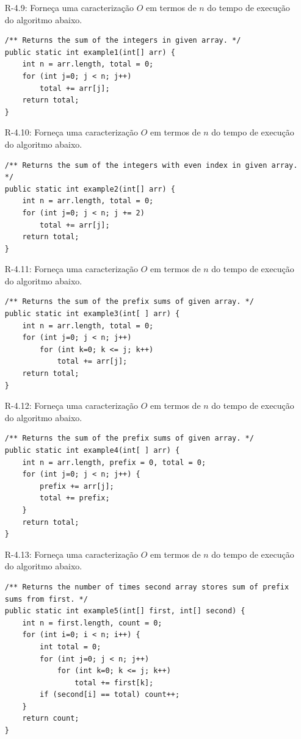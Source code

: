 \begin{enumerate}
\begin{itemize}
		\item[R-4.9:] Forneça uma caracterização $O$ em termos de $n$ do tempo de execução do algoritmo abaixo.
		
\begin{verbatim}
/** Returns the sum of the integers in given array. */
public static int example1(int[] arr) {
	int n = arr.length, total = 0;
	for (int j=0; j < n; j++)
		total += arr[j];
	return total;
}
\end{verbatim}
		
		\item[R-4.10:] Forneça uma caracterização $O$ em termos de $n$ do tempo de execução do algoritmo abaixo.
\begin{verbatim}
/** Returns the sum of the integers with even index in given array. */
public static int example2(int[] arr) {
	int n = arr.length, total = 0;
	for (int j=0; j < n; j += 2)
		total += arr[j];
	return total;
}
\end{verbatim}
		
		\item[R-4.11:] Forneça uma caracterização $O$ em termos de $n$ do tempo de execução do algoritmo abaixo.
\begin{verbatim}
/** Returns the sum of the prefix sums of given array. */
public static int example3(int[ ] arr) {
	int n = arr.length, total = 0;
	for (int j=0; j < n; j++)
		for (int k=0; k <= j; k++)
			total += arr[j];
	return total;
}
\end{verbatim}

		\item[R-4.12:] Forneça uma caracterização $O$ em termos de $n$ do tempo de execução do algoritmo abaixo.
\begin{verbatim}
/** Returns the sum of the prefix sums of given array. */
public static int example4(int[ ] arr) {
	int n = arr.length, prefix = 0, total = 0;
	for (int j=0; j < n; j++) {
		prefix += arr[j];
		total += prefix;
	}
	return total;
}
\end{verbatim}
		
		\item[R-4.13:] Forneça uma caracterização $O$ em termos de $n$ do tempo de execução do algoritmo abaixo.
\begin{verbatim}
/** Returns the number of times second array stores sum of prefix sums from first. */
public static int example5(int[] first, int[] second) {
	int n = first.length, count = 0;
	for (int i=0; i < n; i++) {
		int total = 0;
		for (int j=0; j < n; j++)
			for (int k=0; k <= j; k++)
				total += first[k];
		if (second[i] == total) count++;
	}
	return count;
}
\end{verbatim}		


\end{itemize}
\end{enumerate}
